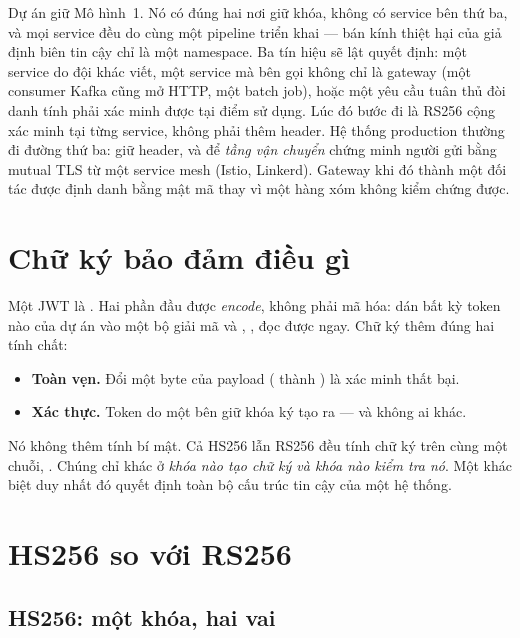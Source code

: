 \begin{decision}
Dự án giữ Mô hình~1. Nó có đúng hai nơi giữ khóa, không có service bên
thứ ba, và mọi service đều do cùng một pipeline triển khai --- bán kính
thiệt hại của giả định biên tin cậy chỉ là một namespace. Ba tín hiệu
sẽ lật quyết định: một service do đội khác viết, một service mà bên gọi
không chỉ là gateway (một consumer Kafka cũng mở HTTP, một batch job),
hoặc một yêu cầu tuân thủ đòi danh tính phải xác minh được tại điểm sử
dụng. Lúc đó bước đi là RS256 cộng xác minh tại từng service, không
phải thêm header. Hệ thống production thường đi đường thứ ba: giữ
header, và để \emph{tầng vận chuyển} chứng minh người gửi bằng mutual
TLS từ một service mesh (Istio, Linkerd). Gateway khi đó thành một đối
tác được định danh bằng mật mã thay vì một hàng xóm không kiểm chứng
được.
\end{decision}

\section{Chữ ký bảo đảm điều gì}

Một JWT là . Hai
phần đầu được \emph{encode}, không phải mã hóa: dán bất kỳ token nào của
dự án vào một bộ giải mã và , ,  đọc
được ngay. Chữ ký thêm đúng hai tính chất:

\begin{itemize}
  \item \textbf{Toàn vẹn.} Đổi một byte của payload
  ( thành ) là xác minh thất bại.
  \item \textbf{Xác thực.} Token do một bên giữ khóa ký tạo ra --- và
  không ai khác.
\end{itemize}

Nó không thêm tính bí mật. Cả HS256 lẫn RS256 đều tính chữ ký trên cùng
một chuỗi, . Chúng
chỉ khác ở \emph{khóa nào tạo chữ ký và khóa nào kiểm tra nó}. Một khác
biệt duy nhất đó quyết định toàn bộ cấu trúc tin cậy của một hệ thống.

\section{HS256 so với RS256}
\label{sec:hs-vs-rs}

\subsection{HS256: một khóa, hai vai}

